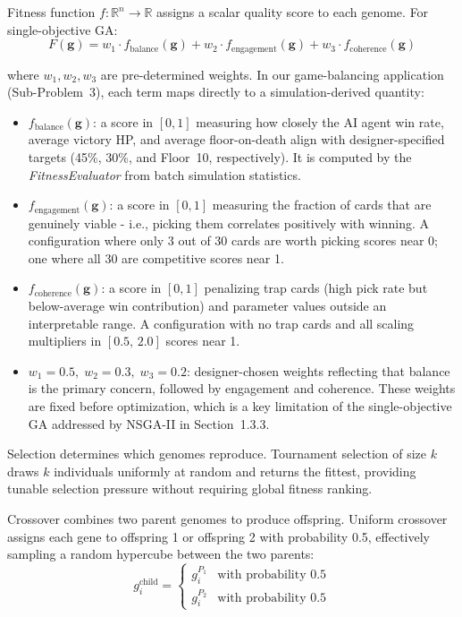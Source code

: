 Fitness function $f: \mathbb{R}^n \to \mathbb{R}$ assigns a scalar quality score to each genome. For single-objective GA:
\begin{equation}
F(\mathbf{g}) = w_1 \cdot f_{\text{balance}}(\mathbf{g}) + w_2 \cdot f_{\text{engagement}}(\mathbf{g}) + w_3 \cdot f_{\text{coherence}}(\mathbf{g})
\label{eq:ga_fitness}
\end{equation}
\begin{sloppypar}
where $w_1, w_2, w_3$ are pre-determined weights. In our game-balancing application (Sub-Problem~3), each term maps directly to a simulation-derived quantity:
\end{sloppypar}
\begin{itemize}
    \item $f_{\text{balance}}(\mathbf{g})$: a score in $[0,1]$ measuring how closely the AI agent win rate, average victory HP, and average floor-on-death align with designer-specified targets (45\%, 30\%, and Floor~10, respectively). It is computed by the \textit{FitnessEvaluator} from batch simulation statistics.
    \item $f_{\text{engagement}}(\mathbf{g})$: a score in $[0,1]$ measuring the fraction of cards that are genuinely viable - i.e., picking them correlates positively with winning. A configuration where only 3 out of 30 cards are worth picking scores near 0; one where all 30 are competitive scores near 1.
    \item $f_{\text{coherence}}(\mathbf{g})$: a score in $[0,1]$ penalizing trap cards (high pick rate but below-average win contribution) and parameter values outside an interpretable range. A configuration with no trap cards and all scaling multipliers in $[0.5,\,2.0]$ scores near 1.
    \item $w_1=0.5,\;w_2=0.3,\;w_3=0.2$: designer-chosen weights reflecting that balance is the primary concern, followed by engagement and coherence. These weights are fixed before optimization, which is a key limitation of the single-objective GA addressed by NSGA-II in Section~1.3.3.
\end{itemize}

Selection determines which genomes reproduce. Tournament selection of size $k$ draws $k$ individuals uniformly at random and returns the fittest, providing tunable selection pressure without requiring global fitness ranking.

Crossover combines two parent genomes to produce offspring. Uniform crossover assigns each gene to offspring 1 or offspring 2 with probability 0.5, effectively sampling a random hypercube between the two parents:
\begin{equation}
g_i^{\text{child}} = \begin{cases} g_i^{P_1} & \text{with probability } 0.5 \\ g_i^{P_2} & \text{with probability } 0.5 \end{cases}
\end{equation}

